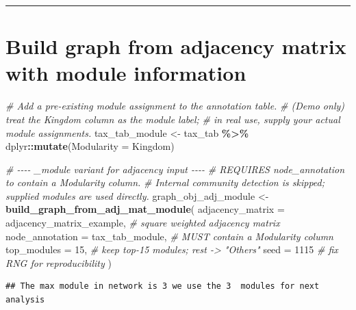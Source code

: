 \documentclass[
]{book}
\newenvironment{Shaded}{\begin{snugshade}}{\end{snugshade}}
\newcommand{\AttributeTok}[1]{\textcolor[rgb]{0.13,0.29,0.53}{#1}}
\newcommand{\CommentTok}[1]{\textcolor[rgb]{0.56,0.35,0.01}{\textit{#1}}}
\newcommand{\DecValTok}[1]{\textcolor[rgb]{0.00,0.00,0.81}{#1}}
\newcommand{\FunctionTok}[1]{\textcolor[rgb]{0.13,0.29,0.53}{\textbf{#1}}}
\newcommand{\NormalTok}[1]{#1}
\newcommand{\OtherTok}[1]{\textcolor[rgb]{0.56,0.35,0.01}{#1}}
\newcommand{\SpecialCharTok}[1]{\textcolor[rgb]{0.81,0.36,0.00}{\textbf{#1}}}
\begin{document}
\begin{center}\rule{0.5\linewidth}{0.5pt}\end{center}

\section{Build graph from adjacency matrix with module information}\label{build-graph-from-adjacency-matrix-with-module-information}

\begin{Shaded}
\begin{Highlighting}[]
\CommentTok{\# Add a pre{-}existing module assignment to the annotation table.}
\CommentTok{\# (Demo only) treat the \textasciigrave{}Kingdom\textasciigrave{} column as the module label;}
\CommentTok{\# in real use, supply your actual module assignments.}
\NormalTok{tax\_tab\_module }\OtherTok{\textless{}{-}}\NormalTok{ tax\_tab }\SpecialCharTok{\%\textgreater{}\%}
\NormalTok{  dplyr}\SpecialCharTok{::}\FunctionTok{mutate}\NormalTok{(}\AttributeTok{Modularity =}\NormalTok{ Kingdom)}
\end{Highlighting}
\end{Shaded}

\begin{Shaded}
\begin{Highlighting}[]
\CommentTok{\# {-}{-}{-}{-} \textasciigrave{}\_module\textasciigrave{} variant for adjacency input {-}{-}{-}{-}}
\CommentTok{\# REQUIRES \textasciigrave{}node\_annotation\textasciigrave{} to contain a \textasciigrave{}Modularity\textasciigrave{} column.}
\CommentTok{\# Internal community detection is skipped; supplied modules are used directly.}
\NormalTok{graph\_obj\_adj\_module }\OtherTok{\textless{}{-}} \FunctionTok{build\_graph\_from\_adj\_mat\_module}\NormalTok{(}
  \AttributeTok{adjacency\_matrix =}\NormalTok{ adjacency\_matrix\_example, }\CommentTok{\# square weighted adjacency matrix}
  \AttributeTok{node\_annotation  =}\NormalTok{ tax\_tab\_module,           }\CommentTok{\# MUST contain a \textasciigrave{}Modularity\textasciigrave{} column}
  \AttributeTok{top\_modules      =} \DecValTok{15}\NormalTok{,                       }\CommentTok{\# keep top{-}15 modules; rest {-}\textgreater{} "Others"}
  \AttributeTok{seed             =} \DecValTok{1115}                      \CommentTok{\# fix RNG for reproducibility}
\NormalTok{)}
\end{Highlighting}
\end{Shaded}

\begin{verbatim}
## The max module in network is 3 we use the 3  modules for next analysis
\end{verbatim}
\end{document}
